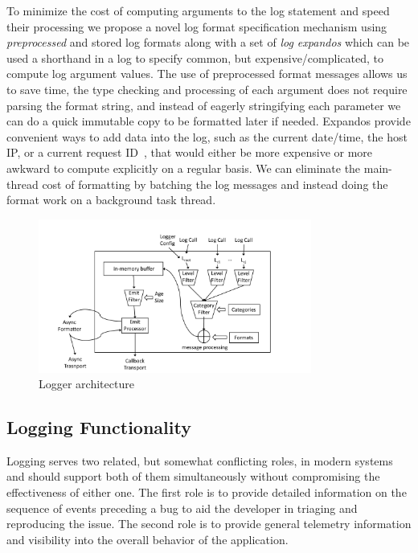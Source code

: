 To minimize the cost of computing arguments to the log statement and speed their 
processing we propose a novel log format specification mechanism using 
\emph{preprocessed} and stored log formats along with a set of \emph{log expandos} 
which can be used a shorthand in a log to specify common, but expensive/complicated, 
to compute log argument values. The use of preprocessed format messages allows us to save time, 
the type checking and processing of each argument does not require parsing the 
format string, and instead of eagerly stringifying each parameter we can do a quick 
immutable copy to be formatted later if needed. Expandos provide convenient 
ways to add data into the log, such as the current date/time, the host IP, or a 
current request ID~\cite{asynchjs}, that would either be more expensive or more awkward to compute 
explicitly on a regular basis. We can eliminate the main-thread cost of formatting by batching 
the log messages and instead doing the format work on a background task thread.


\begin{figure}
    \centering
    \includegraphics[width=0.8\textwidth]{Figures/ArchDiagram}
    \caption{Logger architecture}
    \label{fig:arch}
\end{figure}

\subsection{Logging Functionality}
\label{subsec:functionalitydesign}
\begin{design}
Logging serves two related, but somewhat conflicting roles, in modern systems 
and should support both of them simultaneously without compromising the 
effectiveness of either one. The first role is to provide detailed information 
on the sequence of events preceding a bug to aid the developer in triaging and 
reproducing the issue. The second role is to provide general telemetry 
information and visibility into the overall behavior of the application. 
\end{design}

